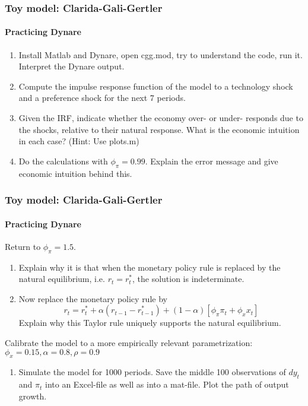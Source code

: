 \documentclass[handout]{beamer}  %
\newcounter{saveenumi}
\newcommand{\seti}{\setcounter{saveenumi}{\value{enumi}}}
\newcommand{\conti}{\setcounter{enumi}{\value{saveenumi}}}
\begin{document}
\begin{frame}\frametitle{Toy model: Clarida-Gali-Gertler}\framesubtitle{Practicing Dynare}
\begin{enumerate}
  \item Install Matlab and Dynare, open cgg.mod, try to understand the code, run it. Interpret the Dynare output.
  \item Compute the impulse response function of the model to a technology shock and a preference shock for the next 7 periods.
  \item Given the IRF, indicate whether the economy over- or under- responds due to the shocks, relative to their natural response. What is the economic intuition in each case? (Hint: Use plots.m)
  \item Do the calculations with $\phi_\pi=0.99$. Explain the error message and give economic intuition behind this.
\seti\end{enumerate}
\end{frame}

\begin{frame}\frametitle{Toy model: Clarida-Gali-Gertler}\framesubtitle{Practicing Dynare}
Return to $\phi_\pi=1.5$.
\begin{enumerate}\conti
  \item Explain why it is that when the monetary policy rule is replaced by the natural equilibrium, i.e. $r_t =r_t^*$, the solution is indeterminate.
  \item Now replace the monetary policy rule by
  \begin{equation*} r_{t} = r_t^{\ast} + \alpha (r_{t-1}-r^\ast_{t-1})+(1-\alpha )\left[ \phi _{\pi }\pi _{t}+\phi _{x}x_{t}\right]\end{equation*}
  Explain why this Taylor rule uniquely supports the natural equilibrium.\seti
\end{enumerate}
Calibrate the model to a more empirically relevant parametrization: $\phi_x=0.15,\alpha=0.8,\rho=0.9$
\begin{enumerate}\conti
   \item Simulate the model for 1000 periods. Save the middle 100 observations of $dy_t$ and $\pi_t$ into an Excel-file as well as into a mat-file. Plot the path of output growth.
\seti\end{enumerate}
\end{frame}
\end{document}
